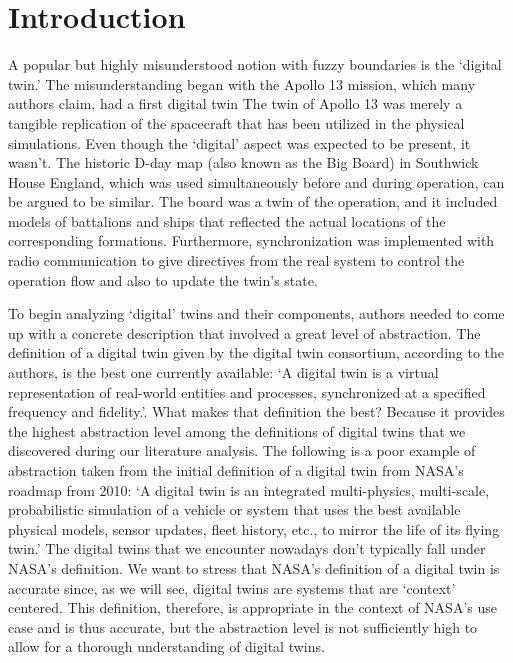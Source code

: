 \documentclass[9pt,conference]{IEEEtran}
\begin{document}
    \section{Introduction}\label{section:introduction}
    A popular but highly misunderstood notion with fuzzy boundaries is the `digital twin.' 
    The misunderstanding began with the Apollo 13 mission, which many authors claim, had a first digital twin The twin of Apollo 13 was merely a tangible replication of the spacecraft that has been utilized in the physical simulations. Even though the `digital' aspect was expected to be present, 
    it wasn't. The historic D-day map (also known as the Big Board) in Southwick House England, which was used simultaneously before and during operation, can be argued to be similar. 
    The board was a twin of the operation, and it included models of battalions and ships that reflected the actual locations of the corresponding formations. 
    Furthermore, synchronization was implemented with radio communication to give directives from the real system to control the operation flow and also to update the twin's state.

    To begin analyzing `digital' twins and their components, authors needed to come up with a concrete description that involved a great level of abstraction. 
    The definition of a digital twin given by the digital twin consortium, according to the authors, is the best one currently available: `A digital twin is a virtual representation of real-world entities and processes, synchronized at a specified frequency and fidelity.'.  
    What makes that definition the best? Because it provides the highest abstraction level among the definitions of digital twins that we discovered during our literature analysis. The following is a poor example of abstraction taken from the initial definition of a digital twin from NASA's roadmap from 2010: `A digital twin is an integrated multi-physics, multi-scale, probabilistic simulation of a 
    vehicle or system that uses the best available physical models, sensor updates, fleet history, etc., to mirror the life of its flying twin.'
    The digital twins that we encounter nowadays don't typically fall under NASA's definition. We want to stress that NASA's definition of a  digital twin is accurate since, as we will see, digital twins are systems that are `context' centered. 
    This definition, therefore, is appropriate in the context of NASA's use case and is thus accurate, but the abstraction level is not sufficiently high to allow for a thorough understanding of digital twins.
\end{document}
